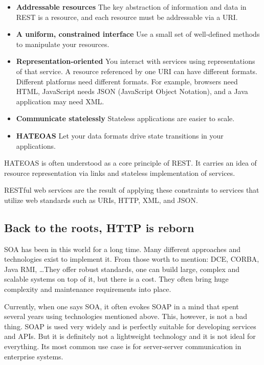 	\begin{itemize}
	  	\item \textbf{Addressable resources} 
	  	The key abstraction of information and data in REST is a resource, and each resource must be addressable via a
	  	\gls{URI}.
		\item \textbf{A uniform, constrained interface}
		Use a small set of well-defined methods to manipulate your resources.
		\item \textbf{Representation-oriented}
		You interact with services using representations of that service. A resource referenced by one URI can have different
		formats. Different platforms need different formats. For example, browsers need HTML, JavaScript needs JSON
		(JavaScript Object Notation), and a Java application may need XML.
		\item \textbf{Communicate statelessly}
		Stateless applications are easier to scale.
		\item \textbf{\gls{HATEOAS}}
		Let your data formats drive state transitions in your applications.
	\end{itemize}
	
	\gls{HATEOAS} is often understood as a core principle of \gls{REST}. It carries an idea of resource representation via
	links and stateless implementation of services.
	
	RESTful web services are the result of applying these constraints to services that utilize web standards such as
	\gls{URI}s, \gls{HTTP}, \gls{XML}, and \gls{JSON}.
	
	\subsection{Back to the roots, HTTP is reborn}
	
	\gls{SOA} has been in this world for a long time. Many different approaches and technologies exist to implement it.
	From those worth to mention: DCE, CORBA, Java RMI, \ldots They offer robust standards, one can build large, complex
	and scalable systems on top of it, but there is a cost. They often bring huge complexity and maintenance requirements
	into place.
	
	Currently, when one says \gls{SOA}, it often evokes \gls{SOAP} in a mind that spent several years using technologies
	mentioned above. This, however, is not a bad thing. \gls{SOAP} is used very widely and is perfectly suitable for
	developing services and \gls{API}s. But it is definitely not a lightweight technology and it is not ideal for
	everything. Its most common use case is for server-server communication in enterprise systems.
	

